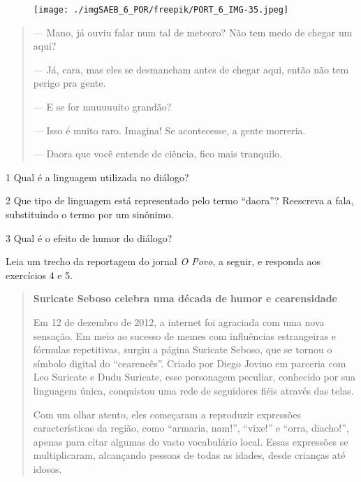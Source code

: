 \begin{figure}[H]
\centering\texttt{[image: ./imgSAEB\_6\_POR/freepik/PORT\_6\_IMG-35.jpeg]}
\end{figure}

\begin{quote}
--- Mano, já ouviu falar num tal de meteoro? Não tem medo de chegar um
aqui?

--- Já, cara, mas eles se desmancham antes de chegar aqui, então
não tem perigo pra gente.

--- E se for muuuuuito grandão?

--- Isso é muito raro. Imagina! Se acontecesse, a gente morreria.

--- Daora que você entende de ciência, fico mais tranquilo.
\end{quote}

\num{1} Qual é a linguagem utilizada no diálogo?


\num{2} Que tipo de linguagem está representado pelo termo ``daora''?
Reescreva a fala, substituindo o termo por um sinônimo.


\num{3} Qual é o efeito de humor do diálogo?


\noindent Leia um trecho da reportagem do jornal \emph{O Povo}, a seguir, e
responda aos exercícios 4 e 5.

\begin{quote}
\centering\textbf{Suricate Seboso celebra uma década de humor e cearensidade}\\
\medskip


\noindent Em 12 de dezembro de 2012, a internet foi agraciada com uma nova
sensação. Em meio ao sucesso de memes com influências estrangeiras e
fórmulas repetitivas, surgiu a página Suricate Seboso, que se tornou o
símbolo digital do ``cearencês''. Criado por Diego Jovino em parceria
com Leo Suricate e Dudu Suricate, esse personagem peculiar, conhecido
por sua linguagem única, conquistou uma rede de seguidores fiéis através
das telas.

Com um olhar atento, eles começaram a reproduzir expressões
características da região, como ``armaria, nam!'', ``vixe!'' e ``orra,
diacho!'', apenas para citar algumas do vasto vocabulário local. Essas
expressões se multiplicaram, alcançando pessoas de todas as idades,
desde crianças até idosos.

\end{quote}

